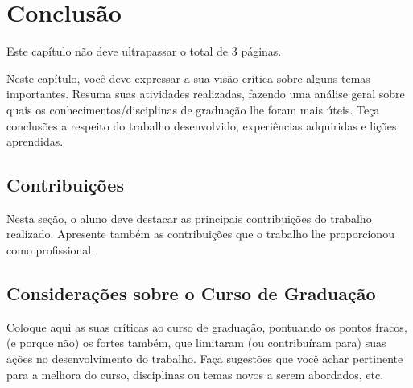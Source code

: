 \chapter{Conclusão}

Este capítulo não deve ultrapassar o total de 3 páginas.

Neste capítulo, você  deve expressar a sua visão  crítica sobre alguns
temas  importantes.  Resuma  suas atividades  realizadas, fazendo  uma
análise geral  sobre quais  os conhecimentos/disciplinas  de graduação
lhe  foram  mais  úteis.   Teça  conclusões  a  respeito  do  trabalho
desenvolvido, experiências adquiridas e lições aprendidas.

\section{Contribuições}
Nesta  seção, o  aluno deve  destacar as  principais contribuições  do
trabalho realizado.  Apresente também as contribuições  que o trabalho
lhe proporcionou como profissional.

\section{Considerações sobre o Curso de Graduação}
Coloque  aqui as  suas críticas  ao curso  de graduação,  pontuando os
pontos  fracos, (e  porque não)  os fortes  também, que  limitaram (ou
contribuíram para)  suas ações  no desenvolvimento do  trabalho.  Faça
sugestões  que  você  achar  pertinente   para  a  melhora  do  curso,
disciplinas ou temas novos a serem abordados, etc.
